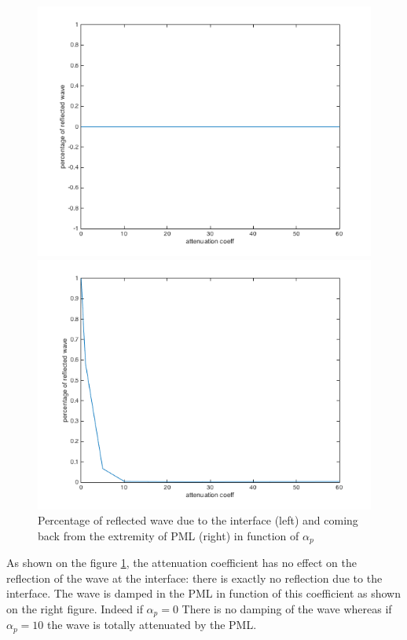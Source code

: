 \begin{figure}[H]
\centering
\begin{minipage}{.5\textwidth}
  \centering
  \includegraphics[width=.8\linewidth]{images/reflected_alphap.png}
\end{minipage}%
\begin{minipage}{.5\textwidth}
  \centering
  \includegraphics[width=.8\linewidth]{images/bouncing_alphap.png}
\end{minipage}
\caption{Percentage of reflected wave due to the interface (left) and coming back from the extremity of PML (right) in function of $\alpha_p$}
\label{fig:refl_alphap}
\end{figure}
As shown on the figure \ref{fig:refl_alphap}, the attenuation coefficient has no effect on the reflection of the wave at the interface: there is exactly no reflection due to the interface.  The wave is damped in the PML in function of this coefficient as shown on the right figure. Indeed if $\alpha_p = 0$ There is no damping of the wave whereas if $\alpha_p = 10$ the wave is totally attenuated by the PML.\\
